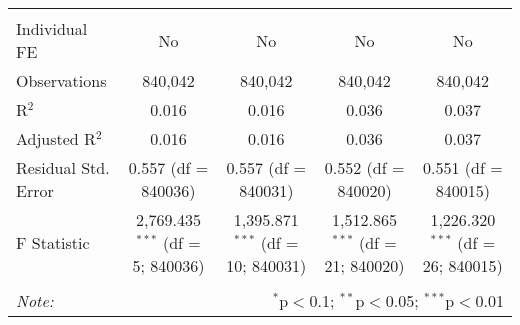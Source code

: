 \documentclass[
]{article}
\begin{document}
\begin{table}[!htbp]
{\begin{tabular}{@{\extracolsep{5pt}}lcccc}
\hline \\[-1.8ex] 
Individual FE & No & No & No & No \\ 
Observations & 840,042 & 840,042 & 840,042 & 840,042 \\ 
R$^{2}$ & 0.016 & 0.016 & 0.036 & 0.037 \\ 
Adjusted R$^{2}$ & 0.016 & 0.016 & 0.036 & 0.037 \\ 
Residual Std. Error & 0.557 (df = 840036) & 0.557 (df = 840031) & 0.552 (df = 840020) & 0.551 (df = 840015) \\ 
F Statistic & 2,769.435$^{***}$ (df = 5; 840036) & 1,395.871$^{***}$ (df = 10; 840031) & 1,512.865$^{***}$ (df = 21; 840020) & 1,226.320$^{***}$ (df = 26; 840015) \\ 
\hline 
\hline \\[-1.8ex] 
\textit{Note:}  & \multicolumn{4}{r}{$^{*}$p$<$0.1; $^{**}$p$<$0.05; $^{***}$p$<$0.01} \\ 
\end{tabular}
} 
\end{table} 
\newpage
\end{document}
